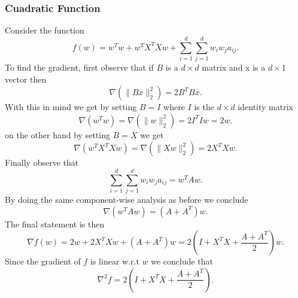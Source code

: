 \documentclass[11pt]{article}
\theoremstyle{plain}
\begin{document}
\subsubsection{Cuadratic Function}
Consider the function
\begin{equation*}
f(w)=w^{T}w+w^{T}X^{T}Xw+\sum_{i=1}^{d}\sum_{j=1}^{d}w_{i}w_{j}a_{ij}.
\end{equation*}
To find the gradient, first observe that if $B$ is a $d\times d$ matrix and x is a $d\times 1$ vector then
\begin{equation*}
\nabla(\|Bx\|_{2}^{2})=2B^{T}Bx.
\end{equation*}
With this in mind we get by setting $B=I$ where $I$ is the $d\times d$ identity matrix
\begin{equation*}
\nabla(w^{T}w)=\nabla(\|w\|_{2}^{2})=2I^{T}Iw=2w.
\end{equation*}
on the other hand by setting $B=X$ we get
\begin{equation*}
\nabla(w^{T}X^{T}Xw)=\nabla(\|Xw\|_{2}^{2})=2X^{T}Xw.
\end{equation*}
Finally observe that 
\begin{equation*}
\sum_{i=1}^{d}\sum_{j=1}^{d}w_{i}w_{j}a_{ij}=w^{T}Aw.
\end{equation*}
By doing the same component-wise analysis as before we conclude 
\begin{equation*}
\nabla( w^{T}Aw)=(A+A^{T})w.
\end{equation*}
The final statement is then
\begin{equation*}
\nabla f(w)=2w+2X^{T}Xw+(A+A^{T})w=2(I+X^{T}X+\frac{A+A^{T}}{2})w.
\end{equation*}
Since the gradient of $f$ is linear w.r.t $w$ we conclude that
\begin{equation*}
\nabla^{2} f=2(I+X^{T}X+\frac{A+A^{T}}{2}).
\end{equation*}
\end{document}
